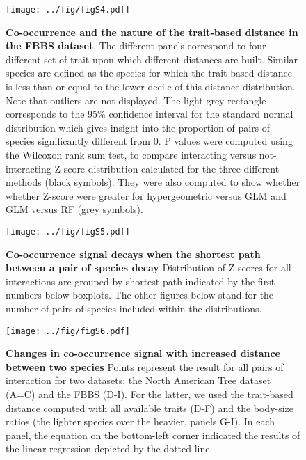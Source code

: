\newpage

\begin{figure}
\centering
\texttt{[image: ../fig/figS4.pdf]}
\caption{\textbf{Co-occurrence and the nature of the trait-based
distance in the FBBS dataset}. The different panels correspond to four
different set of trait upon which different distances are built. Similar
species are defined as the species for which the trait-based distance is
less than or equal to the lower decile of this distance distribution.
Note that outliers are not displayed. The light grey rectangle
corresponds to the 95\% confidence interval for the standard normal
distribution which gives insight into the proportion of pairs of species
significantly different from 0. P values were computed using the
Wilcoxon rank sum test, to compare interacting versus not-interacting
Z-score distribution calculated for the three different methods (black
symbols). They were also computed to show whether whether Z-score were
greater for hypergeometric versus GLM and GLM versus RF (grey
symbols).\label{fig:dist}}
\end{figure}

\newpage

\begin{figure}
\centering
\texttt{[image: ../fig/figS5.pdf]}
\caption{\textbf{Co-occurrence signal decays when the shortest path
between a pair of species decay} Distribution of Z-scores for all
interactions are grouped by shortest-path indicated by the first numbers
below boxplots. The other figures below stand for the number of pairs of
species included within the distributions.\label{fig:sht_pth2}}
\end{figure}

\newpage

\begin{figure}
\centering
\texttt{[image: ../fig/figS6.pdf]}
\caption{\textbf{Changes in co-occurrence signal with increased distance
between two species} Points represent the result for all pairs of
interaction for two datasets: the North American Tree dataset (A=C) and
the FBBS (D-I). For the latter, we used the trait-based distance
computed with all available traits (D-F) and the body-size ratios (the
lighter species over the heavier, panels G-I). In each panel, the
equation on the bottom-left corner indicated the results of the linear
regression depicted by the dotted line.\label{fig:distrev}}
\end{figure}

